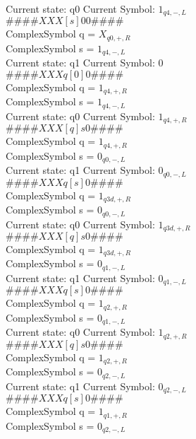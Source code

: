 \documentclass[10pt, a4paper]{article}
\begin{document}
Current state: q0	 Current Symbol: 	 $1_{q4,-,L}$\\
$\# \#\# \# X X X [ s ] 0 0 \# \# \# \# $ \\
ComplexSymbol q = $X_{q0,+,R}$ \\
ComplexSymbol s = $1_{q4,-,L}$ \\ 
 \medskip
Current state: q1	 Current Symbol: 	 $0$\\
$\# \#\# \# X X X q [ 0 ] 0 \# \# \# \# $ \\
ComplexSymbol q = $1_{q4,+,R}$ \\
ComplexSymbol s = $1_{q4,-,L}$ \\ 
 \medskip
Current state: q0	 Current Symbol: 	 $1_{q4,+,R}$\\
$\# \#\# \# X X X [ q ] s 0 \# \# \# \# $ \\
ComplexSymbol q = $1_{q4,+,R}$ \\
ComplexSymbol s = $0_{q0,-,L}$ \\ 
 \medskip
Current state: q1	 Current Symbol: 	 $0_{q0,-,L}$\\
$\# \#\# \# X X X q [ s ] 0 \# \# \# \# $ \\
ComplexSymbol q = $1_{q3d,+,R}$ \\
ComplexSymbol s = $0_{q0,-,L}$ \\ 
 \medskip
Current state: q0	 Current Symbol: 	 $1_{q3d,+,R}$\\
$\# \#\# \# X X X [ q ] s 0 \# \# \# \# $ \\
ComplexSymbol q = $1_{q3d,+,R}$ \\
ComplexSymbol s = $0_{q1,-,L}$ \\ 
 \medskip
Current state: q1	 Current Symbol: 	 $0_{q1,-,L}$\\
$\# \#\# \# X X X q [ s ] 0 \# \# \# \# $ \\
ComplexSymbol q = $1_{q2,+,R}$ \\
ComplexSymbol s = $0_{q1,-,L}$ \\ 
 \medskip
Current state: q0	 Current Symbol: 	 $1_{q2,+,R}$\\
$\# \#\# \# X X X [ q ] s 0 \# \# \# \# $ \\
ComplexSymbol q = $1_{q2,+,R}$ \\
ComplexSymbol s = $0_{q2,-,L}$ \\ 
 \medskip
Current state: q1	 Current Symbol: 	 $0_{q2,-,L}$\\
$\# \#\# \# X X X q [ s ] 0 \# \# \# \# $ \\
ComplexSymbol q = $1_{q1,+,R}$ \\
ComplexSymbol s = $0_{q2,-,L}$ \\ 
\end{document}
